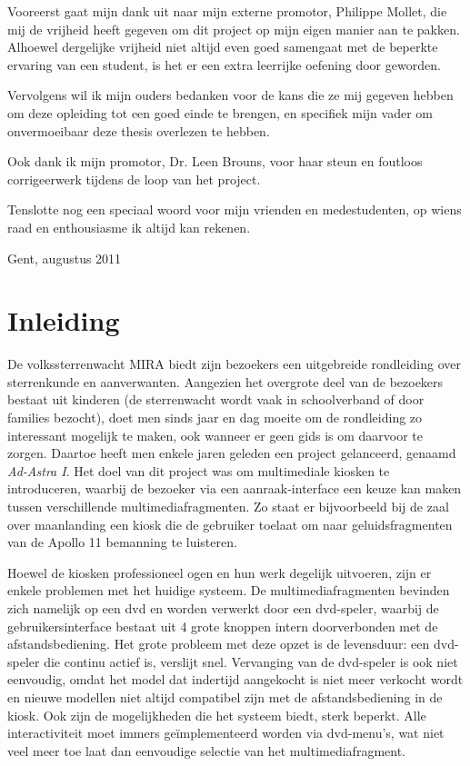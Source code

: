 Vooreerst gaat mijn dank uit naar mijn externe promotor, Philippe Mollet, die mij de vrijheid heeft gegeven om dit project op mijn eigen manier aan te pakken. Alhoewel dergelijke vrijheid niet altijd even goed samengaat met de beperkte ervaring van een student, is het er een extra leerrijke oefening door geworden.

Vervolgens wil ik mijn ouders bedanken voor de kans die ze mij gegeven hebben om deze opleiding tot een goed einde te brengen, en specifiek mijn vader om onvermoeibaar deze thesis overlezen te hebben.

Ook dank ik mijn promotor, Dr. Leen Brouns, voor haar steun en foutloos corrigeerwerk tijdens de loop van het project.

Tenslotte nog een speciaal woord voor mijn vrienden en medestudenten, op wiens raad en enthousiasme ik altijd kan rekenen.

\begin{flushright}
Gent, augustus 2011
\end{flushright} 

\clearpage


%
%

\chapter{Inleiding}
\label{inleiding}

De volkssterrenwacht MIRA biedt zijn bezoekers een uitgebreide rondleiding over sterrenkunde en aanverwanten. Aangezien het overgrote deel van de bezoekers bestaat uit kinderen (de sterrenwacht wordt vaak in schoolverband of door families bezocht), doet men sinds jaar en dag moeite om de rondleiding zo interessant mogelijk te maken, ook wanneer er geen gids is om daarvoor te zorgen. Daartoe heeft men enkele jaren geleden een project gelanceerd, genaamd \emph{Ad-Astra I}. Het doel van dit project was om multimediale kiosken te introduceren, waarbij de bezoeker via een aanraak-interface een keuze kan maken tussen verschillende multimediafragmenten. Zo staat er bijvoorbeeld bij de zaal over maanlanding een kiosk die de gebruiker toelaat om naar geluidsfragmenten van de Apollo 11 bemanning te luisteren.

Hoewel de kiosken professioneel ogen en hun werk degelijk uitvoeren, zijn er enkele problemen met het huidige systeem. De multimediafragmenten bevinden zich namelijk op een \ac{dvd} en worden verwerkt door een \acs{dvd}-speler, waarbij de gebruikersinterface bestaat uit 4 grote knoppen intern doorverbonden met de afstandsbediening.
Het grote probleem met deze opzet is de levensduur: een \acs{dvd}-speler die continu actief is, verslijt snel. Vervanging van de \acs{dvd}-speler is ook niet eenvoudig, omdat het model dat indertijd aangekocht is niet meer verkocht wordt en nieuwe modellen niet altijd compatibel zijn met de afstandsbediening in de kiosk.
Ook zijn de mogelijkheden die het systeem biedt, sterk beperkt. Alle interactiviteit moet immers geïmplementeerd worden via \acs{dvd}-menu's, wat niet veel meer toe laat dan eenvoudige selectie van het multimediafragment.

